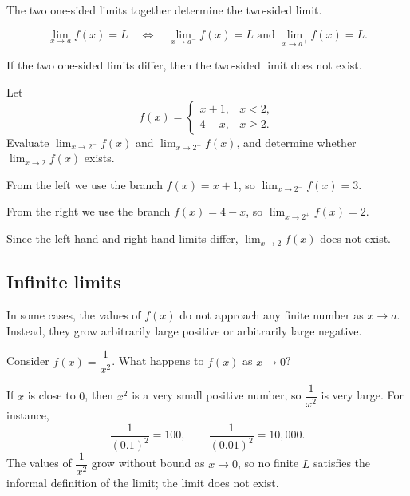 The two one-sided limits together determine the two-sided limit.

\begin{proposition}
\[
\lim_{x \to a} f(x) = L \quad \Longleftrightarrow \quad \lim_{x \to a^{-}} f(x) = L \text{ and } \lim_{x \to a^{+}} f(x) = L.
\]
\end{proposition}

If the two one-sided limits differ, then the two-sided limit does not exist.

\begin{workedexample}
\begin{example}
Let
\[
f(x) =
\begin{cases}
x + 1, & x < 2,\\[4pt]
4 - x, & x \ge 2.
\end{cases}
\]
Evaluate \(\displaystyle\lim_{x \to 2^{-}} f(x)\) and \(\displaystyle\lim_{x \to 2^{+}} f(x)\), and determine whether \(\displaystyle\lim_{x \to 2} f(x)\) exists.
\end{example}

\begin{solution}
From the left we use the branch \(f(x) = x + 1\), so \(\displaystyle\lim_{x \to 2^{-}} f(x) = 3\).

From the right we use the branch \(f(x) = 4 - x\), so \(\displaystyle\lim_{x \to 2^{+}} f(x) = 2\).

Since the left-hand and right-hand limits differ, \(\displaystyle\lim_{x \to 2} f(x)\) does not exist.
\end{solution}
\end{workedexample}

\subsection{Infinite limits}

In some cases, the values of \(f(x)\) do not approach any finite number as \(x \to a\). Instead, they grow arbitrarily large positive or arbitrarily large negative.

\begin{workedexample}
\begin{example}
Consider \(f(x) = \dfrac{1}{x^{2}}\). What happens to \(f(x)\) as \(x \to 0\)?
\end{example}

\begin{solution}
If \(x\) is close to \(0\), then \(x^{2}\) is a very small positive number, so \(\dfrac{1}{x^{2}}\) is very large. For instance,
\[
\frac{1}{(0.1)^{2}} = 100, \qquad \frac{1}{(0.01)^{2}} = 10{,}000.
\]
The values of \(\dfrac{1}{x^{2}}\) grow without bound as \(x \to 0\), so no finite \(L\) satisfies the informal definition of the limit; the limit does not exist.
\end{solution}
\end{workedexample}

